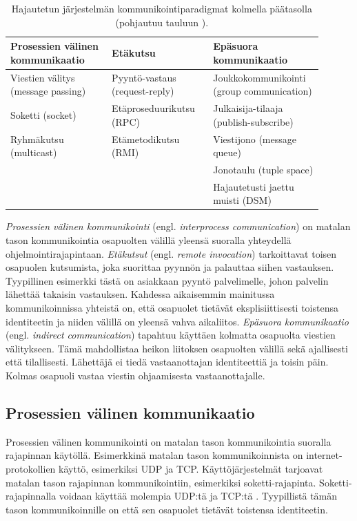 \begin{table}[ht!]
	\caption{Hajautetun järjestelmän kommunikointiparadigmat kolmella päätasolla (pohjautuu tauluun \mbox{\cite[s.~46]{distributed-systems-concepts-and-design}}).}
	\label{tab:communication-paradigms}
	\begin{tabular}{p{0.3\linewidth} | p{0.3\linewidth} | p{0.3\linewidth}}
		\hline
		\textbf{Prosessien välinen kommunikaatio} & \textbf{Etäkutsu} & \textbf{Epäsuora kommunikaatio} \\
		\hline \hline
		Viestien välitys (message passing) & Pyyntö-vastaus (request-reply) & Joukkokommunikointi (group communication) \\
		\hline
		Soketti (socket) & Etäproseduurikutsu (RPC) & Julkaisija-tilaaja (publish-subscribe) \\
		\hline
		Ryhmäkutsu (multicast) & Etämetodikutsu (RMI) & Viestijono (message queue) \\
		\hline
		& & Jonotaulu (tuple space) \\
		\hline
		& & Hajautetusti jaettu muisti (DSM) \\
		\hline
	\end{tabular}
\end{table}

\emph{Prosessien välinen kommunikointi} (engl. \emph{interprocess communication}) on matalan tason kommunikointia osapuolten välillä yleensä suoralla yhteydellä ohjelmointirajapintaan. \emph{Etäkutsut} (engl. \emph{remote invocation}) tarkoittavat toisen osapuolen kutsumista, joka suorittaa pyynnön ja palauttaa siihen vastauksen. Tyypillinen esimerkki tästä on asiakkaan pyyntö palvelimelle, johon palvelin lähettää takaisin vastauksen. Kahdessa aikaisemmin mainitussa kommunikoinnissa yhteistä on, että osapuolet tietävät eksplisiittisesti toistensa identiteetin ja niiden välillä on yleensä vahva aikaliitos. \emph{Epäsuora kommunikaatio} (engl. \emph{indirect communication}) tapahtuu käyttäen kolmatta osapuolta viestien välitykseen. Tämä mahdollistaa heikon liitoksen osapuolten välillä sekä ajallisesti että tilallisesti. Lähettäjä ei tiedä vastaanottajan identiteettiä ja toisin päin. Kolmas osapuoli vastaa viestin ohjaamisesta vastaanottajalle. \mbox{\cite[s.~43--45]{distributed-systems-concepts-and-design}}


\subsection{Prosessien välinen kommunikaatio}
\label{ch:interprocess-communication}
Prosessien välinen kommunikointi on matalan tason kommunikointia suoralla rajapinnan käytöllä. Esimerkkinä matalan tason kommunikoinnista on internet-protokollien käyttö, esimerkiksi UDP ja TCP. Käyttöjärjestelmät tarjoavat matalan tason rajapinnan kommunikointiin, esimerkiksi soketti-rajapinta. Soketti-rajapinnalla voidaan käyttää molempia UDP:tä ja TCP:tä \cite[s.~1152]{linux-programming-interface}. Tyypillistä tämän tason kommunikoinnille on että sen osapuolet tietävät toistensa identiteetin.

